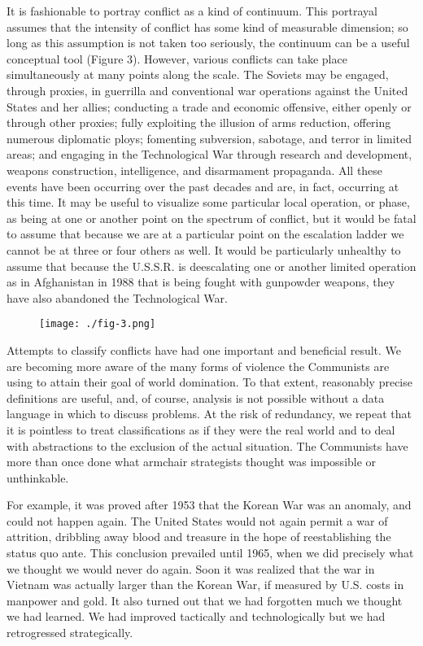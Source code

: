 It is fashionable to portray conflict as a kind of continuum. This portrayal assumes that the intensity of conflict has some kind of measurable dimension; so long as this assumption is not taken too seriously, the continuum can be a useful conceptual tool (Figure 3). However, various conflicts can take place simultaneously at many points along the scale. The Soviets may be engaged, through proxies, in guerrilla and conventional war operations against the United States and her allies; conducting a trade and economic offensive, either openly or through other proxies; fully exploiting the illusion of arms reduction, offering numerous diplomatic ploys; fomenting subversion, sabotage, and terror in limited areas; and engaging in the Technological War through research and development, weapons construction, intelligence, and disarmament propaganda. All these events have been occurring over the past decades and are, in fact, occurring at this time. It may be useful to visualize some particular local operation, or phase, as being at one or another point on the spectrum of conflict, but it would be fatal to assume that because we are at a particular point on the escalation ladder we cannot be at three or four others as well. It would be particularly unhealthy to assume that because the U.S.S.R. is deescalating one or another limited operation as in Afghanistan in 1988 that is being fought with gunpowder weapons, they have also abandoned the Technological War.

\begin{figure}[h!]
    \centering
    \texttt{[image: ./fig-3.png]}
\end{figure}

Attempts to classify conflicts have had one important and beneficial result. We are becoming more aware of the many forms of violence the Communists are using to attain their goal of world domination. To that extent, reasonably precise definitions are useful, and, of course, analysis is not possible without a data language in which to discuss problems. At the risk of redundancy, we repeat that it is pointless to treat classifications as if they were the real world and to deal with abstractions to the exclusion of the actual situation. The Communists have more than once done what armchair strategists thought was impossible or unthinkable.

For example, it was proved after 1953 that the Korean War was an anomaly, and could not happen again. The United States would not again permit a war of attrition, dribbling away blood and treasure in the hope of reestablishing the status quo ante. This conclusion prevailed until 1965, when we did precisely what we thought we would never do again. Soon it was realized that the war in Vietnam was actually larger than the Korean War, if measured by U.S. costs in manpower and gold. It also turned out that we had forgotten much we thought we had learned. We had improved tactically and technologically but we had retrogressed strategically.

